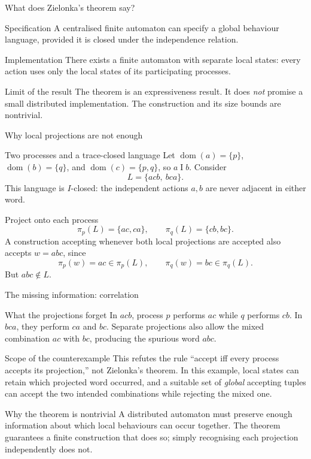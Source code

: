 \documentclass[t,11pt]{beamer}
\newcommand{\domn}{\operatorname{dom}}
\newcommand{\ind}{\mathrel{I}}
\begin{document}
\begin{frame}{What does Zielonka's theorem say?}
  \begin{block}{Specification}
    A centralised finite automaton can specify a global behaviour language, provided it is closed under the independence relation.
  \end{block}
  \begin{block}{Implementation}
    There exists a finite automaton with separate local states: every action uses only the local states of its participating processes.
  \end{block}
  \begin{block}{Limit of the result}
    The theorem is an expressiveness result. It does \emph{not} promise a small distributed implementation. The construction and its size bounds are nontrivial.
  \end{block}
\end{frame}

\begin{frame}{Why local projections are not enough}
  \begin{block}{Two processes and a trace-closed language}
    Let $\domn(a)=\{p\}$, $\domn(b)=\{q\}$, and $\domn(c)=\{p,q\}$, so $a\ind b$. Consider
    \[
      L=\{acb,\ bca\}.
    \]
    This language is $I$-closed: the independent actions $a,b$ are never adjacent in either word.
  \end{block}
  \begin{block}{Project onto each process}
    \[
      \pi_p(L)=\{ac,ca\},\qquad \pi_q(L)=\{cb,bc\}.
    \]
    A construction accepting whenever both local projections are accepted also accepts $w=abc$, since
    \[
      \pi_p(w)=ac\in\pi_p(L),\qquad \pi_q(w)=bc\in\pi_q(L).
    \]
    But $abc\notin L$.
  \end{block}
\end{frame}

\begin{frame}{The missing information: correlation}
  \begin{block}{What the projections forget}
    In $acb$, process $p$ performs $ac$ while $q$ performs $cb$. In $bca$, they perform $ca$ and $bc$. Separate projections also allow the mixed combination $ac$ with $bc$, producing the spurious word $abc$.
  \end{block}
  \begin{block}{Scope of the counterexample}
    This refutes the rule ``accept iff every process accepts its projection,'' not Zielonka's theorem. In this example, local states can retain which projected word occurred, and a suitable set of \emph{global} accepting tuples can accept the two intended combinations while rejecting the mixed one.
  \end{block}
  \begin{block}{Why the theorem is nontrivial}
    A distributed automaton must preserve enough information about which local behaviours can occur together. The theorem guarantees a finite construction that does so; simply recognising each projection independently does not.
  \end{block}
\end{frame}
\end{document}
